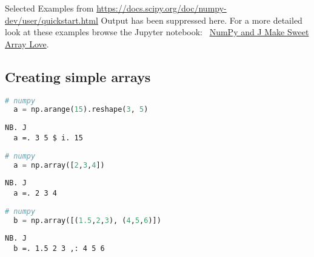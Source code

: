 Selected Examples from
\url{https://docs.scipy.org/doc/numpy-dev/user/quickstart.html} Output
has been suppressed here. For a more detailed look at these examples
browse the Jupyter notebook:~
\href{https://github.com/bakerjd99/jacks/blob/master/numpyjlove/NumPy\%20and\%20J\%20make\%20Sweet\%20Array\%20Love.ipynb}{NumPy
and J Make Sweet Array Love}.


\subsection*{Creating simple arrays}

\begin{lstlisting}[language=python, frame=single, framerule=0pt, basicstyle=\ttfamily\normalsize, keywordstyle=\bfseries\color{keywcolor}\normalsize]
  # numpy
  a = np.arange(15).reshape(3, 5)
\end{lstlisting}

\begin{lstlisting}[language=jdoc, frame=single, framerule=0pt, basicstyle=\ttfamily\normalsize, keywordstyle=\bfseries\color{keywcolor}\normalsize] 
  NB. J 
  a =. 3 5 $ i. 15
\end{lstlisting}

\begin{lstlisting}[language=python, frame=single, framerule=0pt, basicstyle=\ttfamily\normalsize, keywordstyle=\bfseries\color{keywcolor}\normalsize]
  # numpy 
  a = np.array([2,3,4])
\end{lstlisting} 

\begin{lstlisting}[language=jdoc, frame=single, framerule=0pt, basicstyle=\ttfamily\normalsize, keywordstyle=\bfseries\color{keywcolor}\normalsize]    
  NB. J 
  a =. 2 3 4 
\end{lstlisting} 

\begin{lstlisting}[language=python, frame=single, framerule=0pt, basicstyle=\ttfamily\normalsize, keywordstyle=\bfseries\color{keywcolor}\normalsize]
  # numpy 
  b = np.array([(1.5,2,3), (4,5,6)])
\end{lstlisting}

\begin{lstlisting}[language=jdoc, frame=single, framerule=0pt, basicstyle=\ttfamily\normalsize, keywordstyle=\bfseries\color{keywcolor}\normalsize]    
  NB. J 
  b =. 1.5 2 3 ,: 4 5 6
\end{lstlisting}

